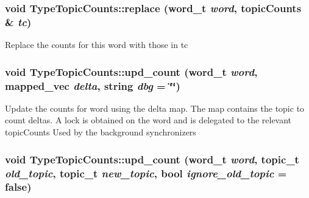 \label{class_type_topic_counts_a8aecfbf940bbc235954488ef3d107075}
\hypertarget{class_type_topic_counts_a8d29734547e3cbe1936282967b62c9e7}{
\subsubsection[{replace}]{\setlength{\rightskip}{0pt plus 5cm}void TypeTopicCounts::replace (word\_\-t {\em word}, \/  {\bf topicCounts} \& {\em tc})}}
\label{class_type_topic_counts_a8d29734547e3cbe1936282967b62c9e7}
Replace the counts for this word with those in tc \hypertarget{class_type_topic_counts_a4cdeb79b31cc51bf74b0cf2824aad62d}{
\subsubsection[{upd\_\-count}]{\setlength{\rightskip}{0pt plus 5cm}void TypeTopicCounts::upd\_\-count (word\_\-t {\em word}, \/  {\bf mapped\_\-vec} {\em delta}, \/  string {\em dbg} = {\ttfamily \char`\"{}\char`\"{}})}}
\label{class_type_topic_counts_a4cdeb79b31cc51bf74b0cf2824aad62d}
Update the counts for word using the delta map. The map contains the topic to count deltas. A lock is obtained on the word and is delegated to the relevant topicCounts Used by the background synchronizers \hypertarget{class_type_topic_counts_a6ccff3b11d661503a45bc382411af9ad}{
\subsubsection[{upd\_\-count}]{\setlength{\rightskip}{0pt plus 5cm}void TypeTopicCounts::upd\_\-count (word\_\-t {\em word}, \/  topic\_\-t {\em old\_\-topic}, \/  topic\_\-t {\em new\_\-topic}, \/  bool {\em ignore\_\-old\_\-topic} = {\ttfamily false})}}
\label{class_type_topic_counts_a6ccff3b11d661503a45bc382411af9ad}
